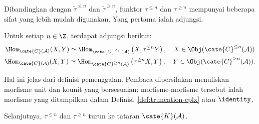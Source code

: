 Dibandingkan dengan $\tilde{\tau}^{\leq n}$ dan
$\tilde{\tau}^{\geq n}$, funktor $\tau^{\leq n}$ dan $\tau^{\geq n}$
mempunyai beberapa sifat yang lebih mudah digunakan. Yang pertama ialah
adjungsi.

\begin{proposisi}\label{prop:truncation-adjunction}
	Untuk setiap $n \in \Z$, terdapat adjungsi berikut:
	\begin{gather*}
		\Hom_{\cate{C}(\mathcal{A})}(X, Y) \simeq \Hom_{\cate{C}^{\leq n}(\mathcal{A})}\left(X, \tau^{\leq n} Y \right), \quad X \in \Obj(\cate{C}^{\leq n}(\mathcal{A})) \\ \Hom_{\cate{C}(\mathcal{A})}(X, Y) \simeq \Hom_{\cate{C}^{\geq n}(\mathcal{A})}\left(\tau^{\geq n} X, Y \right), \quad Y \in \Obj(\cate{C}^{\geq n}(\mathcal{A})).
	\end{gather*}
\end{proposisi}
\begin{bukti}
	Hal ini jelas dari definisi pemenggalan. Pembaca dipersilakan menuliskan
	morfisme unit dan kounit yang bersesuaian: morfisme-morfisme tersebut ialah
	morfisme yang ditampilkan dalam Definisi~\ref{def:truncation-cplx} atau
	$\identity$.
\end{bukti}

Selanjutnya, $\tau^{\leq n}$ dan $\tau^{\geq n}$ turun ke tataran
$\cate{K}(\mathcal{A})$.

